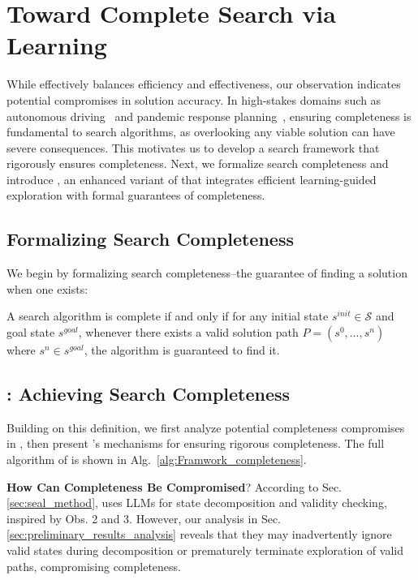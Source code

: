 \section{Toward Complete Search via Learning}
{While \method effectively balances efficiency and effectiveness, our observation indicates potential compromises in solution accuracy. In high-stakes domains such as autonomous driving~\cite{mao2023gpt} and pandemic response planning~\cite{du2024advancing}, ensuring completeness is fundamental to search algorithms, as overlooking any viable solution can have severe consequences. This motivates us to develop a search framework that rigorously ensures completeness. Next, we formalize search completeness and introduce \cmethod, an enhanced variant of \method{} that integrates efficient learning-guided exploration with formal guarantees of completeness.}

\subsection{Formalizing Search Completeness}
\label{subsec:theoretical_foundations}
We begin by formalizing search completeness--the guarantee of finding a solution when one exists:
\begin{definition}
A search algorithm is complete if and only if for any initial state $s^{init} \in \mathcal{S}$ and goal state $s^{goal}$, whenever there exists a valid solution path $P = (s^0, ..., s^n)$ where $s^n \in s^{goal}$, the algorithm is guaranteed to find it.
\end{definition}


\subsection{\cmethod: Achieving Search Completeness}
\label{subsec:method_cs}
Building on this definition, we first analyze potential completeness compromises in \method, then present \cmethod's mechanisms for ensuring rigorous completeness. The full algorithm of \cmethod is shown in Alg.~\ref{alg:Framwork_completeness}.

\noindent \textbf{How Can Completeness Be Compromised}?
According to Sec.\ref{sec:seal_method}, \method uses LLMs for state decomposition and validity checking, inspired by Obs. 2 and 3. However, our analysis in Sec.\ref{sec:preliminary_results_analysis} reveals that they may inadvertently ignore valid states during decomposition or prematurely terminate exploration of valid paths, compromising completeness.

